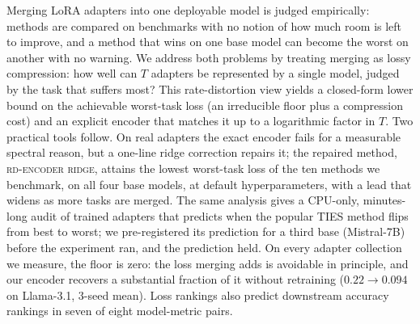 Merging LoRA adapters into one deployable model is judged empirically:
methods are compared on benchmarks with no notion of how much room is
left to improve, and a method that wins on one base model can become
the worst on another with no warning. We address both problems by
treating merging as lossy compression: how well can $T$ adapters be
represented by a single model, judged by the task that suffers most?
This rate-distortion view yields a closed-form lower bound on the
achievable worst-task loss (an irreducible floor plus a compression
cost) and an explicit encoder that matches it up to a logarithmic
factor in $T$. Two practical tools follow. On real adapters the exact
encoder fails for a measurable spectral reason, but a one-line ridge
correction repairs it; the repaired method, \textsc{rd-encoder ridge},
attains the lowest worst-task loss of the ten methods we benchmark, on
all four base models, at default hyperparameters, with a lead that
widens as more tasks are merged. The same analysis gives a CPU-only,
minutes-long audit of trained adapters that predicts when the popular
TIES method flips from best to worst; we pre-registered its prediction
for a third base (Mistral-7B) before the experiment ran, and the
prediction held. On every adapter collection we measure, the floor is
zero: the loss merging adds is avoidable in principle, and our encoder
recovers a substantial fraction of it without retraining ($0.22 \to
0.094$ on Llama-3.1, $3$-seed mean). Loss rankings also predict
downstream accuracy rankings in seven of eight model-metric pairs.

